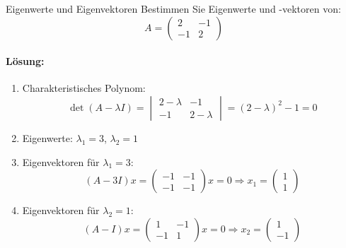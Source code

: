 \begin{example2}{Eigenwerte und Eigenvektoren}
Bestimmen Sie Eigenwerte und -vektoren von:
$$A = \begin{pmatrix}
2 & -1 \\
-1 & 2
\end{pmatrix}$$

\paragraph{Lösung:}
\begin{enumerate}
    \item Charakteristisches Polynom:
    $$\det(A-\lambda I) = \begin{vmatrix} 
    2-\lambda & -1 \\
    -1 & 2-\lambda
    \end{vmatrix} = (2-\lambda)^2 - 1 = 0$$
    
    \item Eigenwerte: $\lambda_1 = 3$, $\lambda_2 = 1$
    
    \item Eigenvektoren für $\lambda_1 = 3$:
    $$(A-3I)x = \begin{pmatrix}
    -1 & -1 \\
    -1 & -1
    \end{pmatrix}x = 0 \Rightarrow x_1 = \begin{pmatrix}
    1 \\
    1
    \end{pmatrix}$$
    
    \item Eigenvektoren für $\lambda_2 = 1$:
    $$(A-I)x = \begin{pmatrix}
    1 & -1 \\
    -1 & 1
    \end{pmatrix}x = 0 \Rightarrow x_2 = \begin{pmatrix}
    1 \\
    -1
    \end{pmatrix}$$
\end{enumerate}
\end{example2}


